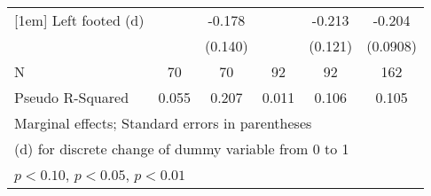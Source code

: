 {\begin{tabular}{l*{5}{c}}
[1em]
Left footed (d)     &                     &      -0.178         &                     &      -0.213\sym{*}  &      -0.204\sym{**} \\
                    &                     &     (0.140)         &                     &     (0.121)         &    (0.0908)         \\
\hline
N                   &          70         &          70         &          92         &          92         &         162         \\
Pseudo R-Squared    &       0.055         &       0.207         &       0.011         &       0.106         &       0.105         \\
\hline\hline
\multicolumn{6}{l}{\footnotesize Marginal effects; Standard errors in parentheses}\\
\multicolumn{6}{l}{\footnotesize  (d) for discrete change of dummy variable from 0 to 1}\\
\multicolumn{6}{l}{\footnotesize \sym{*} \(p<0.10\), \sym{**} \(p<0.05\), \sym{***} \(p<0.01\)}\\
\end{tabular}
}
